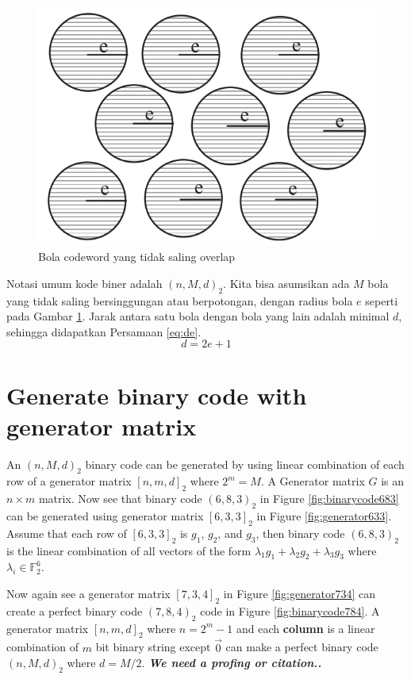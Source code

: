 \documentclass[conference,compsoc]{IEEEtran}
\newcommand{\refeq}[1]{Persamaan \ref{#1}}
\begin{document}
\begin{figure}
\centering
\includegraphics[width=\linewidth]{../img/codewordsball.png}
\caption{Bola codeword yang tidak saling overlap}
\label{fig:codewordsball}
\end{figure}

Notasi umum kode biner adalah $(n,M,d)_2$. Kita bisa asumsikan ada $M$ bola yang tidak saling bersinggungan atau berpotongan, dengan radius bola $e$ seperti pada Gambar \ref{fig:codewordsball}. Jarak antara satu bola dengan bola yang lain adalah minimal $d$, sehingga didapatkan \refeq{eq:de}.
\begin{equation} \label{eq:de}
d = 2e + 1
\end{equation}


\section{Generate binary code with generator matrix}

An $(n,M,d)_2$ binary code can be generated by using linear combination of each row of a generator matrix $[n,m,d]_2$ where $2^m = M$. A Generator matrix $G$ is an $n \times m$ matrix. Now see that binary code $(6,8,3)_2$ in Figure \ref{fig:binarycode683} can be generated using generator matrix $[6,3,3]_2$ in Figure \ref{fig:generator633}. Assume that each row of $[6,3,3]_2$ is $g_1$, $g_2$, and $g_3$, then binary code $(6,8,3)_2$ is the linear combination of all vectors of the form ${\lambda}_1 g_1 + {\lambda}_2 g_2 + {\lambda}_3 g_3$ where $\lambda{_i} \in \mathbb{F}_2^6$.

Now again see a generator matrix $[7,3,4]_2$ in Figure \ref{fig:generator734} can create a perfect binary code $(7,8,4)_2$ code in Figure \ref{fig:binarycode784}. A generator matrix $[n, m, d]_2$ where $n = 2^m - 1$ and each \textbf{column} is a linear combination of $m$ bit binary string except $\vec{0}$ can make a perfect binary code $(n,M,d)_2$ where $d = M/2$. \textbf{\textit{We need a profing or citation..}}
\end{document}
